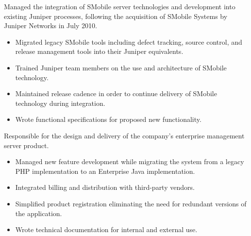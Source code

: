 \documentclass[12pt,letter,sans]{moderncv}
\begin{document}

Managed the integration of SMobile server technologies and development into
existing Juniper processes, following the acquisition of SMobile Systems by
Juniper Networks in July 2010.

\begin{itemize}

    \item Migrated legacy SMobile tools including defect tracking, source
        control, and release management tools into their Juniper equivalents.

    \item Trained Juniper team members on the use and architecture of SMobile technology.

    \item Maintained release cadence in order to continue delivery of SMobile
        technology during integration.

    \item Wrote functional specifications for proposed new functionality.

\end{itemize}


Responsible for the design and delivery of the company's enterprise management
server product.

\begin{itemize}

    \item Managed new feature development while migrating the system from a
        legacy PHP implementation to an Enterprise Java implementation.

    \item Integrated billing and distribution with third-party vendors.

    \item Simplified product registration eliminating the need for redundant
        versions of the application.

    \item Wrote technical documentation for internal and external use.

\end{itemize}
\end{document}
